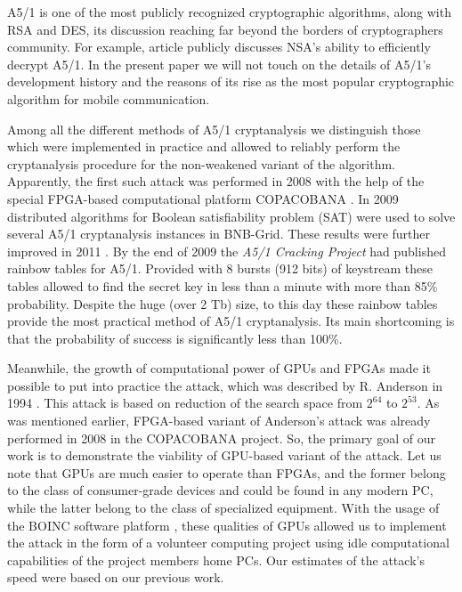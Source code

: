\documentclass[runningheads,a4paper]{llncs}[2015/06/24]
\begin{document}
A5/1 is one of the most publicly recognized cryptographic
algorithms, along with RSA and DES, its discussion reaching far beyond the
borders of cryptographers community. For example, article
\cite{Timberg2013} publicly discusses NSA's ability to efficiently decrypt A5/1.
In the present paper we will not touch on the details of A5/1's development history
and the reasons of its rise as the most popular cryptographic algorithm for mobile communication. 

Among all the different methods of A5/1 cryptanalysis we distinguish those
which were implemented in practice and allowed to reliably perform the
cryptanalysis procedure for the non-weakened variant of the algorithm. Apparently,
the first such attack was performed in 2008 with the help of the special
FPGA-based computational platform COPACOBANA \cite{DBLP:conf/ches/GendrullisNR08}. In 2009 distributed
algorithms for Boolean satisfiability problem (SAT) were used to solve several A5/1
cryptanalysis instances in BNB-Grid\cite{Posypkin2009}. These results were further improved in 2011 \cite{DBLP:conf/pact/SemenovZBP11}. By the end of 2009 the \textit{A5/1 Cracking Project} had published rainbow tables
\cite{Nohl2010} for A5/1. Provided with 8 bursts (912 bits) of keystream these
tables allowed to find the secret key in less than a minute with more than 85\%
probability. Despite the huge (over 2 Tb) size, to this day these rainbow tables
provide the most practical method of A5/1 cryptanalysis. Its main shortcoming
is that the probability of success is significantly less than 100\%. 

Meanwhile, the growth of computational power of GPUs and FPGAs made it possible to put into practice the attack,
which was described by R. Anderson in 1994 \cite{Anderson1994}. This attack is based on reduction of the search space from $2^{64}$ to $2^{53}$.  As was mentioned earlier, FPGA-based variant of Anderson's attack was already performed in 2008 in the COPACOBANA project. So, the primary goal of our work is to demonstrate the viability of
GPU-based variant of the attack. Let us note that GPUs are much easier to
operate than FPGAs, and the former belong to the class of consumer-grade
devices and could be found in any modern PC, while the latter belong to the
class of specialized equipment.  With the usage of the BOINC software platform
\cite{Anderson:2004:BSP:1032646.1033223}, these qualities of GPUs allowed us to implement the attack in
the form of a volunteer computing project using idle computational
capabilities of the project members home PCs.  Our estimates of the attack's speed
were based on our previous work\cite{BulavintsevS2016}.
\end{document}
